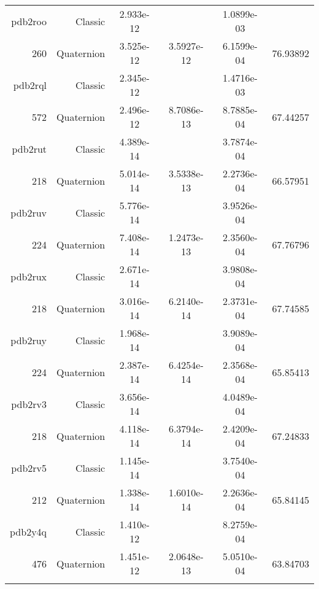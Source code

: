 \begin{xltabular}{\textwidth}{r|rS[table-format=1.3e+2]S[table-format=1.4e+2]S[table-format=1.4e+2]S[table-format=-1.5]}
pdb2roo & Classic & 2.933e-12 &  & 1.0899e-03 & \\
260 & Quaternion & 3.525e-12 & 3.5927e-12 & 6.1599e-04 & 76.93892\\  \addlinespace
pdb2rql & Classic & 2.345e-12 &  & 1.4716e-03 & \\
572 & Quaternion & 2.496e-12 & 8.7086e-13 & 8.7885e-04 & 67.44257\\  \addlinespace
pdb2rut & Classic & 4.389e-14 &  & 3.7874e-04 & \\
218 & Quaternion & 5.014e-14 & 3.5338e-13 & 2.2736e-04 & 66.57951\\  \addlinespace
pdb2ruv & Classic & 5.776e-14 &  & 3.9526e-04 & \\
224 & Quaternion & 7.408e-14 & 1.2473e-13 & 2.3560e-04 & 67.76796\\  \addlinespace
pdb2rux & Classic & 2.671e-14 &  & 3.9808e-04 & \\
218 & Quaternion & 3.016e-14 & 6.2140e-14 & 2.3731e-04 & 67.74585\\  \addlinespace
pdb2ruy & Classic & 1.968e-14 &  & 3.9089e-04 & \\
224 & Quaternion & 2.387e-14 & 6.4254e-14 & 2.3568e-04 & 65.85413\\  \addlinespace
pdb2rv3 & Classic & 3.656e-14 &  & 4.0489e-04 & \\
218 & Quaternion & 4.118e-14 & 6.3794e-14 & 2.4209e-04 & 67.24833\\  \addlinespace
pdb2rv5 & Classic & 1.145e-14 &  & 3.7540e-04 & \\
212 & Quaternion & 1.338e-14 & 1.6010e-14 & 2.2636e-04 & 65.84145\\  \addlinespace
pdb2y4q & Classic & 1.410e-12 &  & 8.2759e-04 & \\
476 & Quaternion & 1.451e-12 & 2.0648e-13 & 5.0510e-04 & 63.84703\\  \addlinespace
\end{xltabular}
